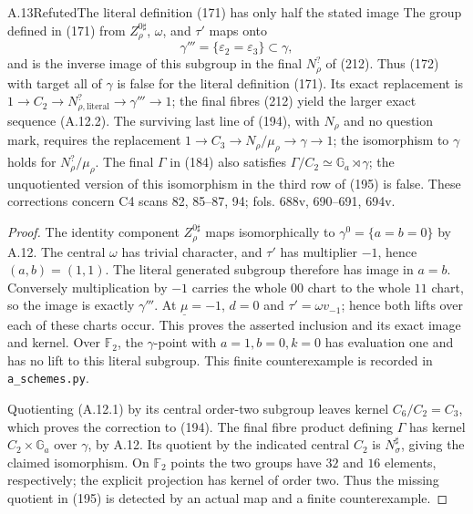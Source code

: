\begin{statement}{A.13}{Refuted}{The literal definition (171) has only half the stated image}
The group defined in (171) from $Z_\rho^{0\sharp}$, $\omega$, and
$\tau'$ maps onto
\[
 \gamma'''=\{\varepsilon_2=\varepsilon_3\}\subset\gamma,
\]
and is the inverse image of this subgroup in the final $N_\rho^?$
of (212). Thus (172) with target all of $\gamma$ is false for
the literal definition (171). Its exact replacement is
$1\to C_2\to N_{\rho,\mathrm{literal}}^?\to\gamma'''\to1$;
the final fibres (212) yield the larger exact sequence (A.12.2).
The surviving last line of (194), with $N_\rho$ and no question mark,
requires the replacement
$1\to C_3\to N_\rho/\mu_\rho\to\gamma\to1$;
the isomorphism to $\gamma$ holds for $N_\rho^?/\mu_\rho$.
The final $\Gamma$ in (184) also satisfies
$\Gamma/C_2\simeq\mathbb G_a\rtimes\gamma$; the unquotiented
version of this isomorphism in the third row of (195) is false.
These corrections concern C4 scans 82, 85--87, 94;
fols. 688v, 690--691, 694v.
\end{statement}
\begin{proof}
The identity component $Z_\rho^{0\sharp}$ maps isomorphically to
$\gamma^0=\{a=b=0\}$ by A.12. The central $\omega$ has trivial
character, and $\tau'$ has multiplier $-1$, hence $(a,b)=(1,1)$.
The literal generated subgroup therefore has image in $a=b$.
Conversely multiplication by $-1$ carries the whole $00$ chart to
the whole $11$ chart, so the image is exactly $\gamma'''$.
At $\underline\mu=-1$, $d=0$ and
$\tau'=\omega v_{-1}$; hence both lifts over each of these charts
occur. This proves the asserted inclusion and its exact image and
kernel. Over $\mathbb F_2$, the $\gamma$-point with $a=1,b=0,k=0$
has evaluation one and has no lift to this literal subgroup. This
finite counterexample is recorded in \texttt{a\_schemes.py}.

Quotienting (A.12.1) by its central order-two subgroup leaves
kernel $C_6/C_2=C_3$, which proves the correction to (194).
The final fibre product defining $\Gamma$ has kernel
$C_2\times\mathbb G_a$ over $\gamma$, by A.12. Its quotient by
the indicated central $C_2$ is $N_\sigma^\sharp$, giving the claimed
isomorphism. On $\mathbb F_2$ points the two groups have $32$ and
$16$ elements, respectively; the explicit projection has kernel of
order two. Thus the missing quotient in (195) is detected by an
actual map and a finite counterexample.
\end{proof}

